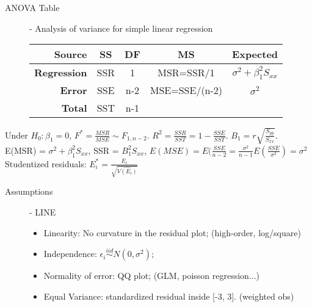 \documentclass[10pt,landscape]{article}
\begin{document}
\begin{multicols}{3}
    
    \begin{description}
    \item[ANOVA Table] - Analysis of variance for simple linear regression \\
        \begin{center}
            \begin{tabular}{r|cccc}
                \textbf{Source}  & \textbf{SS} & \textbf{DF} & \textbf{MS} &\textbf{ Expected}  \\ \hline
                \textbf{Regression} & SSR & 1 & MSR=SSR/1 & $\sigma^2 + \beta_1^2S_{xx}$\\
                \textbf{Error} & SSE & n-2 & MSE=SSE/(n-2) & $\sigma^2$ \\
                \textbf{Total} & SST &  n-1 &\  & \  \\
            \end{tabular}
        \end{center}
\end{description}
    Under $H_0: \beta_1=0$, $F^* = \frac{MSR}{MSE}\sim F_{1,n-2}$. $R^2 = \frac{SSR}{SST} = 1-\frac{SSE}{SST}$. $B_1 = r\sqrt{\frac{S_{yy}}{S_{xx}}}$. \\
    E(MSR) = $\sigma^2 + \beta_1^2S_{xx}$, SSR = $B_1^2S_{xx}$, $E(MSE) = E(\frac{SSE}{n-2} = \frac{\sigma^2}{n-1}E(\frac{SSE}{\sigma^2}) = \sigma^2$\\
    Studentized residuals: $E_i^* = \frac{E_i}{\sqrt{\hat{V(E_i)}}}$ 
    
    \begin{description}
    \item[Assumptions]  - LINE
    \begin{itemize}
    		\item Linearity: No curvature in the residual plot; (high-order, log/square)
    		\item Independence: $\epsilon_i \overset{iid}{\sim} N(0, \sigma^2)$;
    		\item Normality of error: QQ plot; (GLM, poisson regression...)
    		\item Equal Variance: standardized residual inside [-3, 3]. (weighted obs)
    \end{itemize}
    \end{description}


    

\end{multicols}
\end{document}
